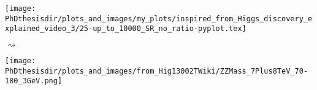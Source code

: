 \begin{frame}
{}
\begin{center}
\begin{minipage}[c]{.4\textwidth}
\texttt{[image: \\PhDthesisdir/plots\_and\_images/my\_plots/inspired\_from\_Higgs\_discovery\_explained\_video\_3/25-up\_to\_10000\_SR\_no\_ratio-pyplot.tex]}
\end{minipage}
\begin{minipage}[c]{.1\textwidth}
\begin{center}
\huge$\rightsquigarrow$
\end{center}
\end{minipage}
\begin{minipage}[c]{.4\textwidth}
\texttt{[image: \\PhDthesisdir/plots\_and\_images/from\_Hig13002TWiki/ZZMass\_7Plus8TeV\_70-180\_3GeV.png]}
\end{minipage}
\end{center}
\end{frame}
